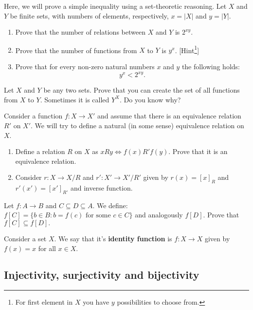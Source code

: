 \begin{exercise}
  Here, we will prove a simple inequality using a set-theoretic reasoning. Let $X$ and $Y$ be finite sets, with numbers of elements, respectively, $x=|X|$ and $y=|Y|$.
  \begin{enumerate}
    \item Prove that the number of relations between $X$ and $Y$ is $2^{xy}$.
    \item Prove that the number of functions from $X$ to $Y$ is $y^x$. [Hint\footnote{For first element in $X$ you have $y$ possibilities to choose from.}]
    \item Prove that for every non-zero natural numbers $x$ and $y$ the following holds:
      $$y^x<2^{xy}.$$
  \end{enumerate}
\end{exercise}

\begin{exercise}
  Let $X$ and $Y$ be any two sets. Prove that you can create the set of all functions from $X$ to $Y$. Sometimes it is called $Y^X$. Do you know why?
\end{exercise}

\begin{exercise}
  Consider a function $f: X\to X'$ and assume that there is an equivalence relation $R'$ on $X'$. We will try to define a natural (in some sense) equivalence relation on $X$.
  \begin{enumerate}
    \item Define a relation $R$ on $X$ as $xRy\Leftrightarrow f(x) R' f(y)$. Prove that it is an equivalence relation.
    \item Consider $r: X\to X/R$ and $r': X'\to X'/R'$ given by $r(x)=[x]_R$ and $r'(x')=[x']_{R'}$ and inverse function.
  \end{enumerate}
\end{exercise}

\begin{exercise}
	Let $f: A\to B$ and $C\subseteq D\subseteq A$. We define: $f[C] = \{b\in B : b=f(c) \text{ for some }c\in C \}$ and analogously $f[D]$. Prove that
	$f[C]\subseteq f[D].$
\end{exercise}

\begin{definition}
  Consider a set $X$. We say that it's \textbf{identity function} is $f:X\to X$ given by $f(x)=x$ for all $x\in X$.
\end{definition}

\subsection{Injectivity, surjectivity and bijectivity}

